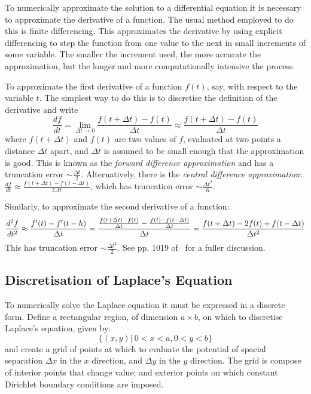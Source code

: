 \documentclass[11pt, a4paper]{article}
\newcommand{\be}{\begin{equation}}
\newcommand{\ee}{\end{equation}}
\begin{document}
To numerically approximate the solution to a differential equation it is
necessary to approximate the derivative of a function. The usual method employed to
do this is finite differencing. This approximates the derivative by using explicit
differencing to step the function from one value to the next in small 
increments of some variable. The smaller the increment used, the more accurate
the approximation, but the longer and more computationally intensive the process.

To approximate the first derivative of a function $f(t)$, say, with respect to the
variable $t$. The simplest way to do this is to discretise the definition of the
derivative and write
%
\be
\frac{df}{dt} = \lim_{\Delta t \to 0} \frac{f(t+\Delta t) - f(t)}{\Delta t} \approx \frac{f(t+\Delta t) - f(t)}{\Delta t}
\ee
%
where $f(t+\Delta t)$ and $f(t)$ are two values of $f$, evaluated at two points
a distance $\Delta t$ apart, and $\Delta t$ is assumed to be small enough that
the approximation is good. This is known as the \emph{forward difference approximation}
and has a truncation error $\sim \frac{\Delta t}{2}$.
Alternatively, there is the \emph{central difference approximation}:
$\frac{df}{dt}\approx \frac{f(t+\Delta t) - f(t-\Delta t)}{2 \Delta t}$, which has
truncation error $\sim \frac{\Delta t^2}{6}$.

Similarly, to approximate the second derivative of a function:
%
\be
\frac{d^2 f}{dt^2} \approx \frac{f'(t) - f'(t-h)}{\Delta t} \\
= \frac{\frac{f(t +\Delta t) - f(t)}{\Delta t} - \frac{f(t) - f(t -\Delta t)}{\Delta t}}{\Delta t} \\
= \frac{f(t +\Delta t) - 2f(t) + f(t-\Delta t)}{\Delta t ^2}
\ee
%
This has truncation error $\sim \frac{\Delta t^2}{2}$. See pp. 1019 of~\cite{mm} for a
fuller discussion.

\subsection{Discretisation of Laplace's Equation}

To numerically solve the Laplace equation it must be expressed in a discrete form.
Define a rectangular region, of dimension $a\times b$, on which to discretise
Laplace's equation, given by:
%
\be
\{(x,y)|\:0<x<a, 0<y<b\}
\ee
%
and create a grid of points at which to evaluate the potential of spacial separation
$\Delta x$ in the $x$ direction, and $\Delta y$ in the $y$ direction. The grid is
compose of interior points that change value; and exterior points on which constant
Dirichlet boundary conditions are imposed.
\end{document}
